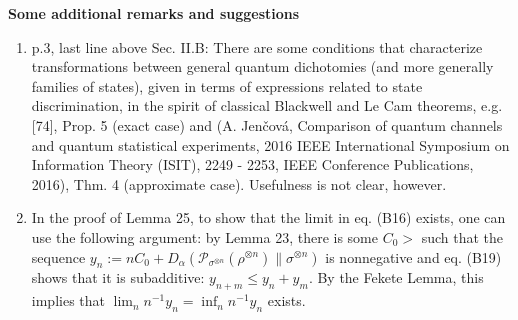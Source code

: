 \documentclass[12pt]{article}
\begin{document}
\noindent
\textbf{Some additional remarks and suggestions}


\begin{enumerate}
\item p.3, last line above Sec. II.B: There are some conditions that characterize  transformations between general
quantum dichotomies (and more generally families of states), given in terms of expressions
related to state discrimination, in the spirit of classical  Blackwell and Le Cam
theorems,  e.g. [74], Prop. 5 (exact case) and  
(A. Jenčová, Comparison of quantum channels and quantum statistical experiments, 2016 IEEE
International Symposium on Information Theory (ISIT), 2249 - 2253, IEEE Conference
Publications, 2016), Thm. 4 (approximate case). Usefulness is not clear, however.


\item In the proof of Lemma 25, to show that the limit in eq. (B16) exists, one can use
the following argument: by Lemma 23, there is some $C_0>$ such that the sequence
$y_n:=nC_0+D_\alpha(\mathcal P_{\sigma^{\otimes n}}(\rho^{\otimes n})\|\sigma^{\otimes
n})$ is nonnegative and eq. (B19) shows that it is subadditive: $y_{n+m}\le y_n+y_m$. By
the Fekete Lemma, this implies that $\lim_n n^{-1}y_n=\inf_n n^{-1}y_n$ exists.





\end{enumerate}
\end{document}
